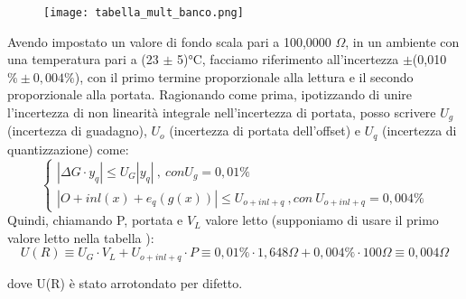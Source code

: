 \begin{figure}[h]
    \centering
    \texttt{[image: tabella\_mult\_banco.png]}
    \label{fig:tab_mult_banco}
\end{figure}
\FloatBarrier

Avendo impostato un valore di fondo scala pari a 100,0000 $\Omega$, in un ambiente con una temperatura pari a (23 $\pm$ 5)°C, facciamo riferimento all'incertezza $\pm$(0,010 $\% \pm 0,004 \%$), con il primo termine proporzionale alla lettura e il secondo proporzionale alla portata.
Ragionando come prima, ipotizzando di unire l'incertezza di non linearità integrale nell'incertezza di portata, posso scrivere $U_g$ (incertezza di guadagno), $U_o$ (incertezza di portata dell'offset) e $U_q$ (incertezza di quantizzazione) come: 
\begin{equation}
\left\{\begin{array}{l}
| \Delta G \cdot y_q | \leq U_G |y_q| \ , \ con U_g=0,01\% \\ 
| O + inl(x) + e_q(g(x)) | \leq U_{o+inl+q} \ , con \ U_{o+inl+q}=0,004\%
\end{array}\right.
\end{equation}
Quindi, chiamando P, portata e $V_L$ valore letto (supponiamo di usare il primo valore letto nella tabella \label{mult_port}):
\begin{equation*}
    U(R) \equiv U_G \cdot V_L + U_{o+inl+q} \cdot P \equiv 0,01\% \cdot 1,648\Omega + 0,004 \% \cdot 100 \Omega \equiv 0,004 \Omega 
\end{equation*}

dove U(R) è stato arrotondato per difetto.

